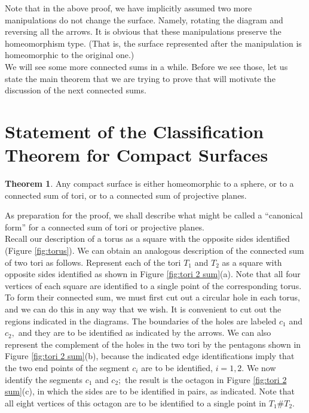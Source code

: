 \documentclass{article}
\theoremstyle{definition}
\newtheorem{theorem}{Theorem}[section]
\begin{document}
Note that in the above proof, we have implicitly assumed two more manipulations do not change the surface. Namely, rotating the diagram and reversing all the arrows. It is obvious that these manipulations preserve the homeomorphism type. (That is, the surface represented after the manipulation is homeomorphic to the original one.)\\
We will see some more connected sums in a while. Before we see those, let us state the main theorem that we are trying to prove that will motivate the discussion of the next connected sums.
%
\section{Statement of the Classification Theorem for Compact Surfaces}\label{sec:statement}
%
\begin{theorem}\label{thm:main}
  Any compact surface is either homeomorphic to a sphere, or to a connected sum of tori, or to a connected sum of projective planes.\\
\end{theorem}
As preparation for the proof, we shall describe what might be called a ``canonical form'' for a connected sum of tori or projective planes.\\
Recall our description of a torus as a square with the opposite sides identified (Figure \ref{fig:torus}). We can obtain an analogous description of the connected sum of two tori as follows. Represent each of the tori $T_1$ and $T_2$ as a square with opposite sides identified as shown in Figure \ref{fig:tori 2 sum}(a). Note that all four vertices of each square are identified to a single point of the corresponding torus. To form their connected sum, we must first cut out a circular hole in each torus, and we can do this in any way that we wish. It is convenient to cut out the regions indicated in the diagrams. The boundaries of the holes are labeled $c_1$ and $c_2,$ and they are to be identified as indicated by the arrows. We can also represent the complement of the holes in the two tori by the pentagons shown in Figure \ref{fig:tori 2 sum}(b), because the indicated edge identifications imply that the two end points of the segment $c_i$ are to be identified, $i = 1, 2.$ We now identify the segments $c_1$ and $c_2;$ the result is the octagon in Figure \ref{fig:tori 2 sum}(c), in which the sides are to be identified in pairs, as indicated. Note that all eight vertices of this octagon are to be identified to a single point in $T_1 \# T_2.$
\end{document}
